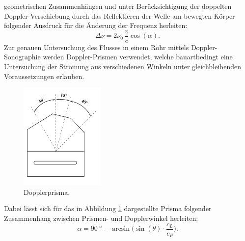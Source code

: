 geometrischen Zusammenhängen und unter Berücksichtigung der doppelten Doppler-Verschiebung durch das Reflektieren der Welle am bewegten Körper folgender Ausdruck für die Änderung der Frequenz
herleiten:
\begin{equation}
  \Delta\nu = 2 \nu_0\, \frac{v}{c} \cos(\alpha) .
  \label{eqn:deltanu}
\end{equation}
Zur genauen Untersuchung des Flusses in einem Rohr mittels Doppler-Sonographie werden Doppler-Prismen verwendet, welche bauartbedingt eine Untersuchung der Strömung aus verschiedenen Winkeln
unter gleichbleibenden Voraussetzungen erlauben.
\begin{figure}
  \centering
  \includegraphics{images/prisma.png}
  \caption{Dopplerprisma.\cite{sample}}
  \label{fig:prisma}
\end{figure}
Dabei lässt sich für das in Abbildung \ref{fig:prisma} dargestellte Prisma folgender Zusammenhang zwischen Prismen- und Dopplerwinkel herleiten:
\begin{equation}
  \alpha = \SI{90}{\degree} - \arcsin\bigl(\sin(\theta)\cdot\frac{c_L}{c_P}\bigr) .
  \label{eqn:prisma}
\end{equation}

